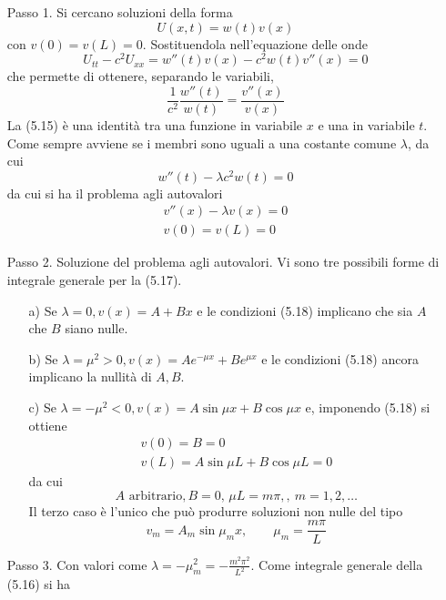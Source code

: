 \documentclass[a4paper,12pt, draft]{article}
\theoremstyle{break}
\numberwithin{equation}{section}
\begin{document}
\begin{itemize}
  \item[Passo 1.] Si cercano soluzioni della forma 
  \[
  U(x,t) = w(t)v(x) 
  \] 
  con \(v(0) = v(L) = 0\). Sostituendola nell'equazione delle onde 
  \[
  U_{tt}-c^2U_{xx} = w''(t)v(x)-c^2w(t)v''(x) = 0
  \]
  che permette di ottenere, separando le variabili,
  \begin{equation}
    \frac{1}{c^2}\frac{w''(t)}{w(t)} = \frac{v''(x)}{v(x)}
  \end{equation}
  La (5.15) è una identità tra una funzione in variabile \(x\) e una in variabile \(t\). Come sempre avviene se i membri sono uguali a una costante comune \(\lambda\), da cui 
  \begin{equation}
    w''(t)-\lambda c^2 w(t) = 0
  \end{equation}
  da cui si ha il problema agli autovalori 
  \begin{eqnarray}
    v''(x) - \lambda v(x)= 0 \\
    v(0) = v(L) = 0
  \end{eqnarray}
  \item[Passo 2.] Soluzione del problema agli autovalori. Vi sono tre possibili forme di integrale generale per la (5.17).
  \begin{itemize}
    \item[a)] Se \(\lambda = 0, v(x) = A + Bx\) e le condizioni (5.18) implicano che sia \(A\) che \(B\) siano nulle.
    \item[b)] Se \(\lambda = \mu^2 > 0, v(x) = Ae^{-\mu x} + Be^{\mu x}\) e le condizioni (5.18) ancora implicano la nullità di \(A, B\).
    \item[c)] Se \(\lambda = -\mu^2 < 0, v(x) = A\sin \mu x + B\cos \mu x\) e, imponendo (5.18) si ottiene
    \begin{eqnarray*}
      v(0) =  B = 0 \\
      v(L) = A \sin \mu L + B \cos \mu L = 0
    \end{eqnarray*}  
    da cui 
    \[
      A \mbox{ arbitrario,} \, B = 0, \, \mu L = m\pi, ,\ m = 1, 2, \ldots
    \]
    Il terzo caso è l'unico che può produrre soluzioni non nulle del tipo 
  \begin{equation}
    v_m = A_m \sin \mu_m x, \qquad \mu_m = \frac{m\pi}{L}
  \end{equation}  
  \end{itemize}
  \item[Passo 3.] Con valori come \(\lambda = -\mu_m^2 = -\frac{m^2\pi^2}{L^2}\). Come integrale generale della (5.16) si ha 

\end{itemize}
\end{document}
